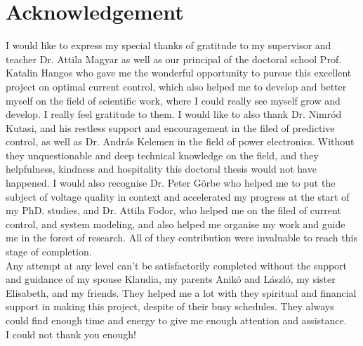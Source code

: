 \chapter*{Acknowledgement}
\thispagestyle{plain}
I would like to express my special thanks of gratitude to my supervisor and teacher Dr. Attila Magyar as well as our principal of the doctoral school Prof. Katalin Hangos who gave me the wonderful opportunity to pursue this excellent project on optimal current control, which also helped me to develop and better myself on the field of scientific work, where I could really see myself grow and develop. I really feel gratitude to them. I would like to also thank Dr. Nimród Kutasi, and his restless support and encouragement in the filed of predictive control, as well as Dr. András Kelemen in the field of power electronics. Without they unquestionable and deep technical knowledge on the field, and they helpfulness, kindness and hospitality this doctoral thesis would not have happened. I would also recognise Dr. Peter Görbe who helped me to put the subject of voltage quality in context and accelerated my progress at the start of my PhD. studies, and Dr. Attila Fodor, who helped me on the filed of current control, and system modeling, and also helped me organise my work and guide me in the forest of research. All of they contribution were invaluable to reach this stage of completion.\\
Any attempt at any level can't be satisfactorily completed without the support and guidance of my spouse Klaudia, my parents Anikó and László, my sister Elisabeth, and my friends. They helped me a lot with they spiritual and financial support in making this project, despite of their busy schedules. They always could find enough time and energy to give me enough attention and assistance.\\
I could not thank you enough!

\newpage
\null
\thispagestyle{empty}%
\newpage



